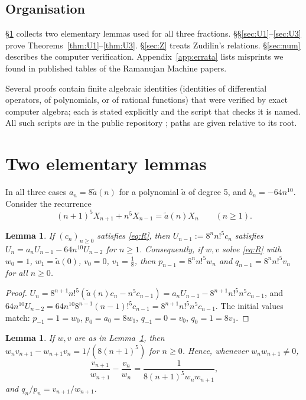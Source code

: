 \documentclass[11pt]{amsart}
\newtheorem{lemma}[theorem]{Lemma}
\theoremstyle{definition}
\theoremstyle{remark}
\numberwithin{equation}{section}
\newcommand{\at}{\tilde a}
\begin{document}
\subsection{Organisation}
\S\ref{sec:prelim} collects two elementary lemmas used for all three fractions. \S\S\ref{sec:U1}--\ref{sec:U3} prove Theorems~\ref{thm:U1}--\ref{thm:U3}. \S\ref{sec:Z} treats Zudilin's relations. \S\ref{sec:num} describes the computer verification. Appendix~\ref{app:errata} lists misprints we found in published tables of the Ramanujan Machine papers.

Several proofs contain finite algebraic identities (identities of differential operators, of polynomials, or of rational functions) that were verified by exact computer algebra; each is stated explicitly and the script that checks it is named. All such scripts are in the public repository \cite{code}; paths are given relative to its root.

\section{Two elementary lemmas}\label{sec:prelim}

In all three cases $a_n=8\at(n)$ for a polynomial $\at$ of degree 5, and $b_n=-64n^{10}$. Consider the recurrence
\begin{equation}\label{eq:R}
(n+1)^5X_{n+1}+n^5X_{n-1}=\at(n)X_n\qquad(n\ge1).
\end{equation}

\begin{lemma}\label{lem:gauge}
If $(c_n)_{n\ge0}$ satisfies \eqref{eq:R}, then $U_{n-1}:=8^nn!^5c_n$ satisfies $U_n=a_nU_{n-1}-64n^{10}U_{n-2}$ for $n\ge1$. Consequently, if $w,v$ solve \eqref{eq:R} with $w_0=1$, $w_1=\at(0)$, $v_0=0$, $v_1=\frac18$, then $p_{n-1}=8^nn!^5w_n$ and $q_{n-1}=8^nn!^5v_n$ for all $n\ge0$.
\end{lemma}

\begin{proof}
$U_n=8^{n+1}n!^5(\at(n)c_n-n^5c_{n-1})=a_nU_{n-1}-8^{n+1}n!^5n^5c_{n-1}$, and $64n^{10}U_{n-2}=64n^{10}8^{n-1}(n-1)!^5c_{n-1}=8^{n+1}n!^5n^5c_{n-1}$. The initial values match: $p_{-1}=1=w_0$, $p_0=a_0=8w_1$, $q_{-1}=0=v_0$, $q_0=1=8v_1$.
\end{proof}

\begin{lemma}\label{lem:cas}
If $w,v$ are as in Lemma~\ref{lem:gauge}, then $w_nv_{n+1}-w_{n+1}v_n=1/(8(n+1)^5)$ for $n\ge0$. Hence, whenever $w_nw_{n+1}\neq0$,
\begin{equation}\label{eq:cas}
\frac{v_{n+1}}{w_{n+1}}-\frac{v_n}{w_n}=\frac1{8(n+1)^5w_nw_{n+1}},
\end{equation}
and $q_n/p_n=v_{n+1}/w_{n+1}$.
\end{lemma}
\end{document}
